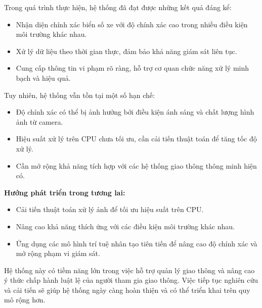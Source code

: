 \documentclass[conference]{IEEEtran}
\begin{document}
Trong quá trình thực hiện, hệ thống đã đạt được những kết quả đáng kể:
\begin{itemize}
    \item Nhận diện chính xác biển số xe với độ chính xác cao trong nhiều điều kiện môi trường khác nhau.
    \item Xử lý dữ liệu theo thời gian thực, đảm bảo khả năng giám sát liên tục.
    \item Cung cấp thông tin vi phạm rõ ràng, hỗ trợ cơ quan chức năng xử lý minh bạch và hiệu quả.
\end{itemize}

Tuy nhiên, hệ thống vẫn tồn tại một số hạn chế:
\begin{itemize}
    \item Độ chính xác có thể bị ảnh hưởng bởi điều kiện ánh sáng và chất lượng hình ảnh từ camera.
    \item Hiệu suất xử lý trên CPU chưa tối ưu, cần cải tiến thuật toán để tăng tốc độ xử lý.
    \item Cần mở rộng khả năng tích hợp với các hệ thống giao thông thông minh hiện có.
\end{itemize}

\textbf{Hướng phát triển trong tương lai:}
\begin{itemize}
    \item Cải tiến thuật toán xử lý ảnh để tối ưu hiệu suất trên CPU.
    \item Nâng cao khả năng thích ứng với các điều kiện môi trường khác nhau.
    \item Ứng dụng các mô hình trí tuệ nhân tạo tiên tiến để nâng cao độ chính xác và mở rộng phạm vi giám sát.
\end{itemize}

Hệ thống này có tiềm năng lớn trong việc hỗ trợ quản lý giao thông và nâng cao ý thức chấp hành luật lệ của người tham gia giao thông. Việc tiếp tục nghiên cứu và cải tiến sẽ giúp hệ thống ngày càng hoàn thiện và có thể triển khai trên quy mô rộng hơn.
\end{document}
